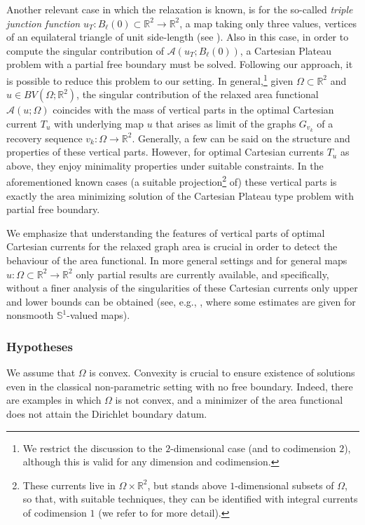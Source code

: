 \documentclass[11pt]{article}
\numberwithin{equation}{section}
\newcommand{\R}{\mathbb{R}}
\let\Om\Omega
\theoremstyle{definition}
\begin{document}
Another relevant case in which the relaxation
is known, is for the so-called \textit{triple junction function}
$u_T:B_\ell(0)\subset\R^2\to \R^2$, a map taking only
three values, vertices of an equilateral triangle of unit side-length (see \cite{BePa:10,Scala:19}). Also in this case,
in order to compute the singular contribution of $\mathcal A(u_T;B_\ell(0))$, a Cartesian Plateau problem with a partial free boundary must be solved. Following our approach, it is possible to reduce this problem to our setting.
In general,\footnote{We restrict the discussion to the $2$-dimensional case (and to codimension $2$), although this is valid for any dimension and codimension.} given $\Om\subset \R^2$ and $u\in BV(\Om;\R^2)$, the singular contribution of the relaxed area functional $\mathcal A(u;\Om)$ coincides with the mass of vertical parts in the optimal Cartesian current $T_u$ with underlying map $u$ that arises as limit of the graphs $G_{v_k}$ of a recovery sequence $v_k:\Om\to \R^2$. Generally, a few can be said on the structure and properties of these vertical parts. However, for optimal Cartesian currents $T_u$ as above, they enjoy minimality properties under suitable constraints. In the aforementioned known cases (a suitable projection\footnote{These currents live in $\Om\times \R^2$, but stands above $1$-dimensional subsets of $\Omega$, so that, with suitable techniques, they can be identified with integral currents of codimension $1$ (we refer to \cite{BES1,BES2,BES3,BePa:10,Scala:19} for more detail).} of) these vertical parts is exactly the area minimizing solution of the Cartesian Plateau type problem with partial free boundary.

We emphasize that understanding the features of vertical parts of optimal Cartesian currents for the relaxed graph area is crucial in order to detect the behaviour of the area functional. In more general settings and for general maps $u:\Om\subset \R^2\to \R^2$
only partial results are currently available, and specifically, without a
finer analysis of the singularities of these Cartesian currents
only upper and lower bounds can be obtained
(see, e.g., \cite{BSS,ScSc}, where some estimates are given for nonsmooth $\mathbb S^1$-valued maps).

\subsubsection*{Hypotheses} We assume that $\Om$ is convex.
Convexity is crucial to ensure existence of solutions even
in the classical non-parametric setting with no free boundary.
Indeed, there are examples in which $\Om$ is not convex, and a
minimizer of the area functional does not attain the Dirichlet boundary datum.
\end{document}
